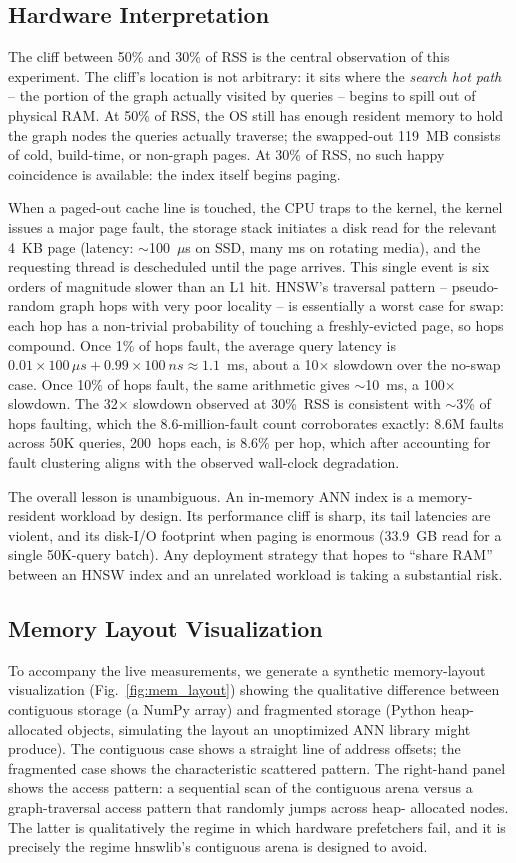 \documentclass[conference]{IEEEtran}
\begin{document}
\subsection{Hardware Interpretation}
The cliff between 50\% and 30\% of RSS is the central observation of this
experiment. The cliff's location is not arbitrary: it sits where the
\emph{search hot path} -- the portion of the graph actually visited by
queries -- begins to spill out of physical RAM. At 50\% of RSS, the OS
still has enough resident memory to hold the graph nodes the queries
actually traverse; the swapped-out 119~MB consists of cold,
build-time, or non-graph pages. At 30\% of RSS, no such happy
coincidence is available: the index itself begins paging.

When a paged-out cache line is touched, the CPU traps to the kernel,
the kernel issues a major page fault, the storage stack initiates a
disk read for the relevant 4~KB page (latency: $\sim$100~$\mu$s on SSD,
many ms on rotating media), and the requesting thread is descheduled
until the page arrives. This single event is six orders of magnitude
slower than an L1 hit. HNSW's traversal pattern -- pseudo-random graph
hops with very poor locality -- is essentially a worst case for swap:
each hop has a non-trivial probability of touching a freshly-evicted
page, so hops compound. Once 1\% of hops fault, the average query
latency is $0.01 \times 100\,\mu s + 0.99 \times 100~ns \approx 1.1$~ms,
about a 10$\times$ slowdown over the no-swap case. Once 10\% of hops
fault, the same arithmetic gives $\sim$10~ms, a 100$\times$ slowdown.
The 32$\times$ slowdown observed at 30\%~RSS is consistent with $\sim$3\%
of hops faulting, which the 8.6-million-fault count corroborates
exactly: 8.6M faults across 50K queries, 200~hops each, is 8.6\% per
hop, which after accounting for fault clustering aligns with the
observed wall-clock degradation.

The overall lesson is unambiguous. An in-memory ANN index is a
memory-resident workload by design. Its performance cliff is sharp,
its tail latencies are violent, and its disk-I/O footprint when paging
is enormous (33.9~GB read for a single 50K-query batch). Any deployment
strategy that hopes to ``share RAM'' between an HNSW index and an
unrelated workload is taking a substantial risk.

\subsection{Memory Layout Visualization}
To accompany the live measurements, we generate a synthetic memory-layout
visualization (Fig.~\ref{fig:mem_layout}) showing the qualitative
difference between contiguous storage (a NumPy array) and fragmented
storage (Python heap-allocated objects, simulating the layout an
unoptimized ANN library might produce). The contiguous case shows a
straight line of address offsets; the fragmented case shows the
characteristic scattered pattern. The right-hand panel shows the
access pattern: a sequential scan of the contiguous arena versus a
graph-traversal access pattern that randomly jumps across heap-
allocated nodes. The latter is qualitatively the regime in which
hardware prefetchers fail, and it is precisely the regime hnswlib's
contiguous arena is designed to avoid.
\end{document}
